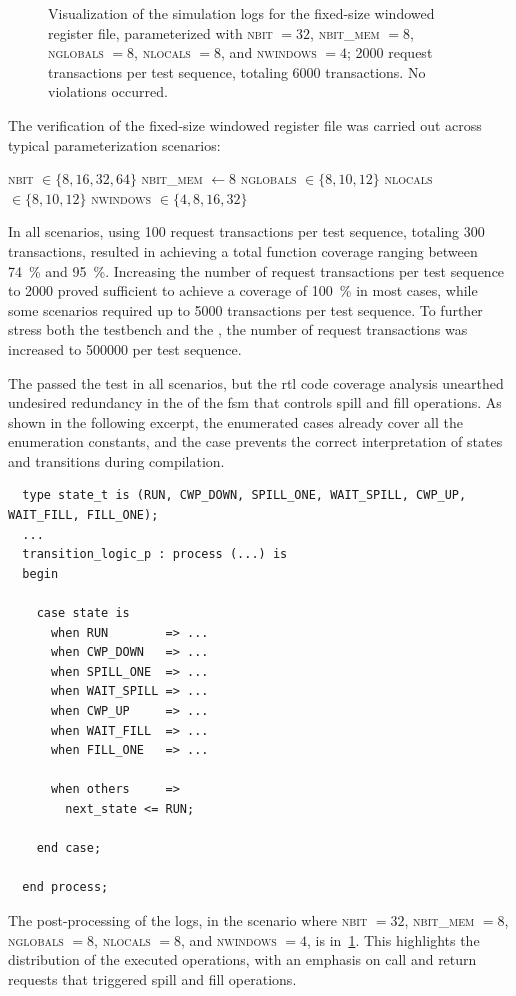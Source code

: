 \begin{figure}
\begin{adjustwidth}{-1cm}{-1cm}
\end{adjustwidth}
\caption{Visualization of the simulation logs for the fixed-size windowed register file, parameterized with \textsc{nbit} $= 32$, \textsc{nbit\_mem} $= 8$, \textsc{nglobals} $= 8$, \textsc{nlocals} $= 8$, and \textsc{nwindows} $= 4$; 2000 request transactions per test sequence, totaling 6000 transactions. No violations occurred.}
\label{fig:wrf-sim_328884}
\end{figure}

The verification of the fixed-size windowed register file was carried out across typical parameterization scenarios:
\begin{algorithmic}
\State \textsc{nbit} $\in \{8, 16, 32, 64\}$
\State \textsc{nbit\_mem} $\gets 8$ 
\State \textsc{nglobals} $\in \{8, 10, 12\}$
\State \textsc{nlocals}  $\in \{8, 10, 12\}$
\State \textsc{nwindows} $\in \{4, 8, 16, 32\}$ 
\end{algorithmic}
In all scenarios, using 100 request transactions per test sequence, totaling 300 transactions, resulted in achieving a total function coverage ranging between \qty{74}{\percent} and \qty{95}{\percent}. Increasing the number of request transactions per test sequence to \num{2000} proved sufficient to achieve a coverage of \qty{100}{\percent} in most cases, while some scenarios required up to \num{5000} transactions per test sequence. To further stress both the testbench and the \dut, the number of request transactions was increased to \num{500000} per test sequence.

The \dut passed the test in all scenarios, but the \ac{rtl} code coverage analysis unearthed undesired redundancy in the  of the \ac{fsm} that controls spill and fill operations. As shown in the following excerpt, the enumerated cases already cover all the enumeration constants, and the  case prevents the correct interpretation of states and transitions during \questa compilation. 

\begin{verbatim}
  type state_t is (RUN, CWP_DOWN, SPILL_ONE, WAIT_SPILL, CWP_UP, WAIT_FILL, FILL_ONE);
  ...
  transition_logic_p : process (...) is
  begin

    case state is
      when RUN        => ...
      when CWP_DOWN   => ...
      when SPILL_ONE  => ...
      when WAIT_SPILL => ...
      when CWP_UP     => ...
      when WAIT_FILL  => ...
      when FILL_ONE   => ...
      
      when others     =>
        next_state <= RUN;

    end case;

  end process;
\end{verbatim}

The post-processing of the logs, in the scenario where \textsc{nbit} $= 32$, \textsc{nbit\_mem} $= 8$, \textsc{nglobals} $= 8$, \textsc{nlocals} $= 8$, and \textsc{nwindows} $= 4$, is in~\cref{fig:wrf-sim_328884}. This highlights the distribution of the executed operations, with an emphasis on call and return requests that triggered spill and fill operations.
